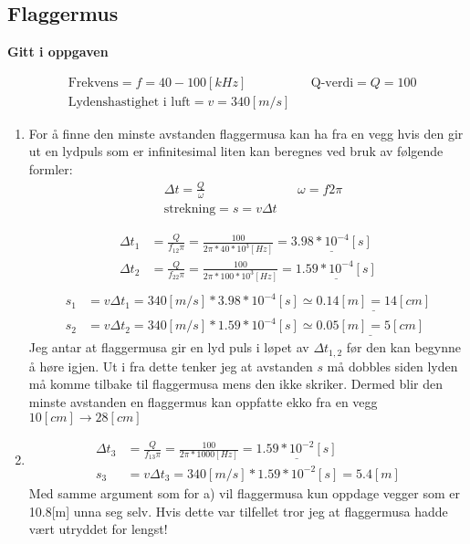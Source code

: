 \documentclass[a4paper,12pt,norsk]{article}
\newcommand{\uu}{\underline}
\begin{document}
\subsection{Flaggermus}
\begin{center}
\textbf{Gitt i oppgaven}
\end{center}
\begin{align*}
&\text{Frekvens} = f = 40-100[kHz] && \text{Q-verdi} = Q = 100 \\
&\text{Lydenshastighet i luft} = v = 340[m/s]
\end{align*}
\begin{enumerate}[label=(\alph*)]
\item 
For å finne den minste avstanden flaggermusa kan ha fra en vegg hvis den gir ut en lydpuls som er infinitesimal liten kan beregnes ved bruk av følgende formler:
\begin{align*}
&\Delta t = \frac{Q}{\omega} && \omega = f2\pi\\
&\text{strekning} = s = v\Delta t 
\end{align*}

\begin{align*}
\Delta t_1 &= \frac{Q}{f_12\pi} = \frac{100}{2\pi * 40*10^3[Hz]} = \uu{3.98*10^{-4}[s]}\\
\Delta t_2 &= \frac{Q}{f_22\pi} = \frac{100}{2\pi * 100*10^3[Hz]} = \uu{1.59*10^{-4}[s]}\\
\end{align*}
\begin{align*}
s_1 &= v\Delta t_1 = 340[m/s]*3.98*10^{-4}[s] \simeq \uu{0.14[m] = 14[cm]}\\
s_2 &= v\Delta t_2 = 340[m/s]*1.59*10^{-4}[s] \simeq \uu{0.05[m] = 5[cm]}
\end{align*}
Jeg antar at flaggermusa gir en lyd puls i løpet av $\Delta t_{1,2}$ før den kan begynne å høre igjen. Ut i fra dette tenker jeg at avstanden $s$ må dobbles siden lyden må komme tilbake til flaggermusa mens den ikke skriker. Dermed blir den minste avstanden en flaggermus kan oppfatte ekko fra en vegg  $10[cm] \rightarrow28[cm]$
\item 
\begin{align*}
\Delta t_3 &= \frac{Q}{f_13\pi} = \frac{100}{2\pi * 1000[Hz]} = \uu{1.59*10^{-2}[s]}\\
s_3 &= v\Delta t_3 =340[m/s]*1.59*10^{-2}[s] = 5.4[m]
\end{align*}
Med samme argument som for a) vil flaggermusa kun oppdage vegger som er 10.8[m] unna seg selv. Hvis dette var tilfellet tror jeg at flaggermusa hadde vært utryddet for lengst!
\end{enumerate}
\end{document}
